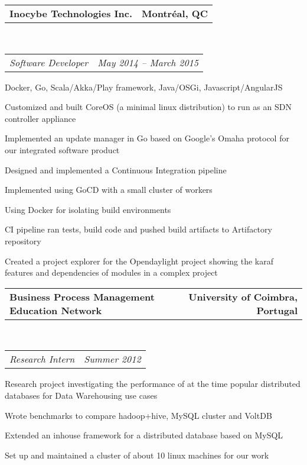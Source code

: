 \documentclass[10pt,letterpaper]{article}
\makeatletter
\newcommand{\headerrow}[2]
{\begin{tabular*}{\linewidth}{l@{\extracolsep{\fill}}r}
	#1 &
	#2 \\
\end{tabular*}}
\makeatother
\begin{document}
\begin{itemize}
	\item
	\headerrow
		{\textbf{Inocybe Technologies Inc.}}
		{\textbf{Montr\'{e}al, QC}}
	\\
	\headerrow
		{\emph{Software Developer}}
		{\emph{May 2014 -- March 2015}}
                \item Created a project explorer for the Opendaylight project showing the karaf features and dependencies of modules in a complex project
	\end{itemize*}

	\item
	\headerrow
		{\textbf{Business Process Management Education Network}}
		{\textbf{University of Coimbra, Portugal}}
	\\
	\headerrow
		{\emph{Research Intern}}
		{\emph{Summer 2012}}
	\begin{itemize*}
		\item Research project investigating the performance of at the time popular distributed databases for Data Warehousing use cases
		\item Wrote benchmarks to compare hadoop+hive, MySQL cluster and VoltDB
		\item Extended an inhouse framework for a distributed database based on MySQL
		\item Set up and maintained a cluster of about 10 linux machines for our work
	\end{itemize*}

\end{itemize}
\end{document}
